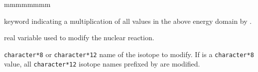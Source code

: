 \begin{ListeDeDescription}{mmmmmmmm}
\item[\moc{MULT}] keyword indicating a multiplication of all values in the above energy domain by .

\item[\dusa{value}] real variable used to modify the nuclear reaction.

\item[\dusa{HISOT}] {\tt character*8} or {\tt character*12} name of the isotope to modify. If  is a {\tt character*8} value,
all {\tt character*12} isotope names prefixed by  are modified.

\end{ListeDeDescription}

\eject
